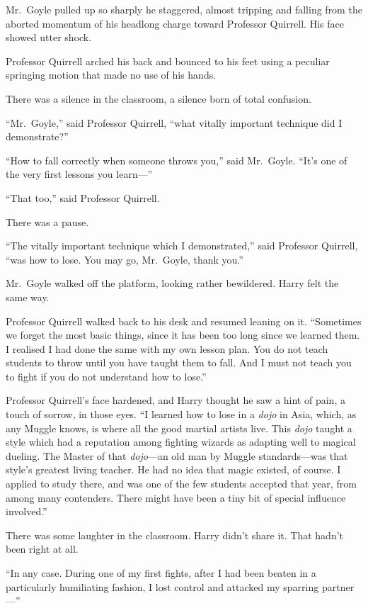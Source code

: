 Mr.~Goyle pulled up so sharply he staggered, almost tripping and falling
from the aborted momentum of his headlong charge toward Professor
Quirrell. His face showed utter shock.

Professor Quirrell arched his back and bounced to his feet using a
peculiar springing motion that made no use of his hands.

There was a silence in the classroom, a silence born of total confusion.

``Mr.~Goyle,'' said Professor Quirrell, ``what vitally important
technique did I demonstrate?''

``How to fall correctly when someone throws you,'' said Mr.~Goyle.
``It's one of the very first lessons you learn---''

``That too,'' said Professor Quirrell.

There was a pause.

``The vitally important technique which I demonstrated,'' said Professor
Quirrell, ``was how to lose. You may go, Mr.~Goyle, thank you.''

Mr.~Goyle walked off the platform, looking rather bewildered. Harry felt
the same way.

Professor Quirrell walked back to his desk and resumed leaning on it.
``Sometimes we forget the most basic things, since it has been too long
since we learned them. I realised I had done the same with my own lesson
plan. You do not teach students to throw until you have taught them to
fall. And I must not teach you to fight if you do not understand how to
lose.''

Professor Quirrell's face hardened, and Harry thought he saw a hint of
pain, a touch of sorrow, in those eyes. ``I learned how to lose in a
\emph{dojo} in Asia, which, as any Muggle knows, is where all the good
martial artists live. This \emph{dojo} taught a style which had a
reputation among fighting wizards as adapting well to magical dueling.
The Master of that \emph{dojo}---an old man by Muggle standards---was
that style's greatest living teacher. He had no idea that magic existed,
of course. I applied to study there, and was one of the few students
accepted that year, from among many contenders. There might have been a
tiny bit of special influence involved.''

There was some laughter in the classroom. Harry didn't share it. That
hadn't been right at all.

``In any case. During one of my first fights, after I had been beaten in
a particularly humiliating fashion, I lost control and attacked my
sparring partner---''

